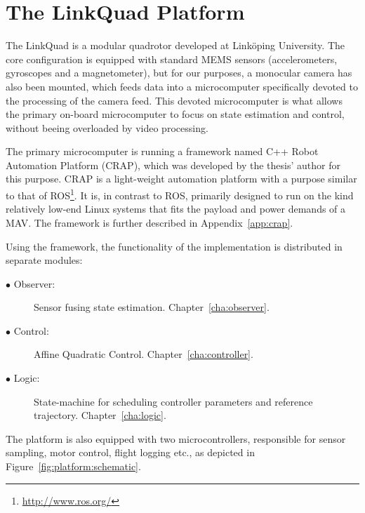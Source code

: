 \section{The LinkQuad Platform}
    The LinkQuad is a modular quadrotor developed at Linköping University.
    The core configuration is equipped with standard MEMS sensors
    (accelerometers, gyroscopes and a magnetometer),
    but for our purposes, a monocular camera has also been mounted, which feeds data
    into a microcomputer specifically devoted to the processing of the camera feed.
    This devoted microcomputer is what allows the primary on-board microcomputer
    to focus on state estimation and control, without beeing overloaded by
    video processing.

    The primary microcomputer is running a framework named C++ Robot Automation Platform (CRAP),
    which was developed by the thesis' author for this purpose. CRAP is a light-weight
    automation platform with a purpose similar to that of ROS\footnote{\url{http://www.ros.org/}}.
    It is, in contrast to ROS, primarily designed to run on the kind relatively low-end Linux systems
    that fits the payload and power demands of a MAV. The framework is further
    described in Appendix~\ref{app:crap}.

    Using the framework, the functionality of the implementation is
    distributed in separate modules:
    \begin{description}
        \item[$\bullet$ Observer:] Sensor fusing state estimation. Chapter~\ref{cha:observer}.
        \item[$\bullet$ Control:]  Affine Quadratic Control. Chapter~\ref{cha:controller}.
        \item[$\bullet$ Logic:]    State-machine for scheduling controller parameters and reference trajectory. Chapter~\ref{cha:logic}.
    \end{description}

    The platform is also equipped with two microcontrollers, responsible
    for sensor sampling, motor control, flight logging etc., as depicted in
    Figure~\ref{fig:platform:schematic}.


